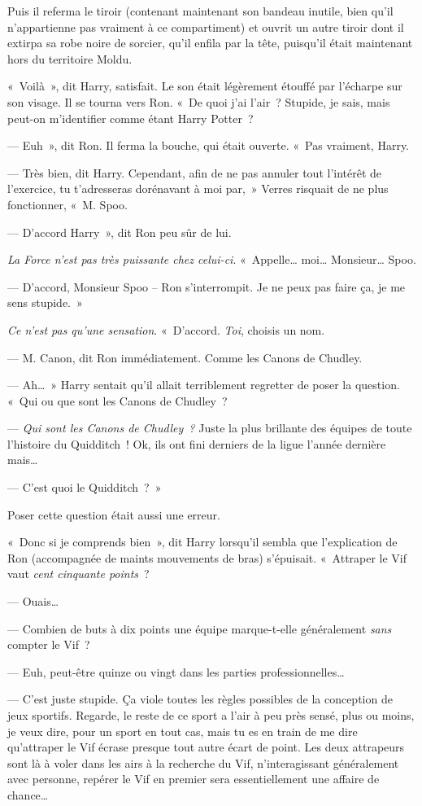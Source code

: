 Puis il referma le tiroir (contenant maintenant son bandeau inutile, bien qu'il n'appartienne pas vraiment à ce compartiment) et ouvrit un autre tiroir dont il extirpa sa robe noire de sorcier, qu'il enfila par la tête, puisqu'il était maintenant hors du territoire Moldu.

«~Voilà~», dit Harry, satisfait. Le son était légèrement étouffé par l'écharpe sur son visage. Il se tourna vers Ron.  «~De quoi j'ai l'air~? Stupide, je sais, mais peut-on m'identifier comme étant Harry Potter~?

--- Euh~», dit Ron. Il ferma la bouche, qui était ouverte. «~Pas vraiment, Harry.

--- Très bien, dit Harry. Cependant, afin de ne pas annuler tout l'intérêt de l'exercice, tu t'adresseras dorénavant à moi par,~» Verres risquait de ne plus fonctionner, «~M. Spoo.

--- D'accord Harry~», dit Ron peu sûr de lui.

\emph{La Force n'est pas très puissante chez celui-ci}. «~Appelle… moi… Monsieur… Spoo.

--- D'accord, Monsieur Spoo -- Ron s'interrompit. Je ne peux pas faire ça, je me sens stupide.~»

\emph{Ce n'est pas qu'une sensation}. «~D'accord. \emph{Toi}, choisis un nom.

--- M. Canon, dit Ron immédiatement. Comme les Canons de Chudley.

--- Ah…~» Harry sentait qu'il allait terriblement regretter de poser la question. «~Qui ou que sont les Canons de Chudley~?

--- \emph{Qui sont les Canons de Chudley~?} Juste la plus brillante des équipes de toute l'histoire du Quidditch~! Ok, ils ont fini derniers de la ligue l'année dernière mais…

--- C'est quoi le Quidditch~?~»

Poser cette question était aussi une erreur.

«~Donc si je comprends bien~», dit Harry lorsqu'il sembla que l'explication de Ron (accompagnée de maints mouvements de bras) s'épuisait. «~Attraper le Vif vaut \emph{cent cinquante points}~?

--- Ouais…

--- Combien de buts à dix points une équipe marque-t-elle généralement \emph{sans} compter le Vif~?

--- Euh, peut-être quinze ou vingt dans les parties professionnelles…

--- C'est juste stupide. Ça viole toutes les règles possibles de la conception de jeux sportifs.
Regarde, le reste de ce sport a l'air à peu près sensé, plus ou moins, je veux dire, pour un sport en tout cas, mais tu es en train de me dire qu'attraper le Vif écrase presque tout autre écart de point.
Les deux attrapeurs sont là à voler dans les airs à la recherche du Vif, n'interagissant généralement avec personne, repérer le Vif en premier sera essentiellement une affaire de chance…

